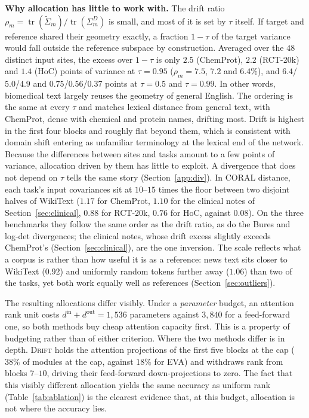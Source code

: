 \documentclass[conference,onecolumn]{IEEEtran}
\newcommand{\method}{\textsc{Drift}}
\newcommand{\tr}{\operatorname{tr}}
\begin{document}
\noindent\textbf{Why allocation has little to work with.} The drift ratio
$\rho_m = \tr(\widetilde{\Sigma}_m)/\tr(\Sigma^{D}_m)$ is small, and most of it
is set by $\tau$ itself. If target and reference shared their geometry exactly,
a fraction $1-\tau$ of the target variance would fall outside the reference
subspace by construction. Averaged over the $48$ distinct input sites, the
excess over $1-\tau$ is only $2.5$ (ChemProt), $2.2$ (RCT-20k) and $1.4$ (HoC)
points of variance at $\tau = 0.95$ ($\rho_m = 7.5$, $7.2$ and $6.4\%$), and
$6.4$/$5.0$/$4.9$ and $0.75$/$0.56$/$0.37$ points at $\tau = 0.5$ and
$\tau = 0.99$. In other words, biomedical text largely reuses the geometry of
general English. The ordering is the same at every $\tau$ and matches lexical
distance from general text, with ChemProt, dense with chemical and protein
names, drifting most. Drift is highest in the first four blocks and roughly flat
beyond them, which is consistent with domain shift entering as unfamiliar
terminology at the lexical end of the network. Because the differences between
sites and tasks amount to a few points of variance, allocation driven by them
has little to exploit. A divergence that does not depend on $\tau$ tells the
same story (Section~\ref{app:div}). In CORAL distance, each task's input
covariances sit at $10$--$15$ times the floor between two disjoint halves of
WikiText ($1.17$ for ChemProt, $1.10$ for the clinical notes
of Section~\ref{sec:clinical}, $0.88$ for RCT-20k, $0.76$ for HoC, against
$0.08$). On the three benchmarks they follow the same order as the drift ratio,
as do the Bures and log-det divergences; the clinical notes, whose drift excess
slightly exceeds ChemProt's (Section~\ref{sec:clinical}), are the one inversion.
The scale reflects what a corpus is rather than how
useful it is as a reference: news text sits closer to WikiText ($0.92$) and
uniformly random tokens further away ($1.06$) than two of the tasks, yet both
work equally well as references (Section~\ref{sec:outliers}).

The resulting allocations differ visibly. Under a \emph{parameter} budget, an
attention rank unit costs $d^{\mathrm{in}}+d^{\mathrm{out}} = 1{,}536$
parameters against $3{,}840$ for a feed-forward one, so both methods buy cheap
attention capacity first. This is a property of budgeting rather than of either
criterion. Where the two methods differ is in depth. \method{} holds the
attention projections of the first five blocks at the cap ($38\%$ of modules at
the cap, against $18\%$ for EVA) and withdraws rank from blocks $7$--$10$,
driving their feed-forward down-projections to zero. The fact that this visibly
different allocation yields the same accuracy as uniform rank
(Table~\ref{tab:ablation}) is the clearest evidence that, at this budget,
allocation is not where the accuracy lies.
\end{document}
